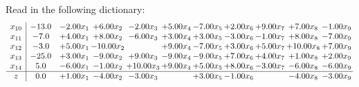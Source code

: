 \documentclass[9pt]{article}
\begin{document}
Read in the following dictionary:
\[\begin{array}{c| c c@{\hskip 2pt} c@{\hskip 2pt} c@{\hskip 2pt} c@{\hskip 2pt} c@{\hskip 2pt} c@{\hskip 2pt} c@{\hskip 2pt} c@{\hskip 2pt} c@{\hskip 2pt} }
 x_{10}   &  -13.0 & -2.00 x_{1} & +  6.00 x_{2} & -2.00 x_{3} & +  5.00 x_{4} & -7.00 x_{5} & +  2.00 x_{6} & +  9.00 x_{7} & +  7.00 x_{8} & -1.00 x_{9}\\
 x_{11}   &  -7.0 & +  4.00 x_{1} & +  8.00 x_{2} & -6.00 x_{3} & +  3.00 x_{4} & +  3.00 x_{5} & -3.00 x_{6} & -1.00 x_{7} & +  8.00 x_{8} & -7.00 x_{9}\\
 x_{12}   &  -3.0 & +  5.00 x_{1} & -10.00 x_{2} &   & +  9.00 x_{4} & -7.00 x_{5} & +  3.00 x_{6} & +  5.00 x_{7} & + 10.00 x_{8} & +  7.00 x_{9}\\
 x_{13}   &  -25.0 & +  3.00 x_{1} & -9.00 x_{2} & +  9.00 x_{3} & -9.00 x_{4} & -9.00 x_{5} & +  7.00 x_{6} & +  4.00 x_{7} & +  1.00 x_{8} & +  2.00 x_{9}\\
 x_{14}   &  5.0 & -6.00 x_{1} & -1.00 x_{2} & + 10.00 x_{3} & +  9.00 x_{4} & +  5.00 x_{5} & +  8.00 x_{6} & -3.00 x_{7} & -6.00 x_{8} & -6.00 x_{9}\\
\hline
z    &  0.0 & +  1.00 x_{1} & -4.00 x_{2} & -3.00 x_{3} &   & +  3.00 x_{5} & -1.00 x_{6} &   & -4.00 x_{8} & -3.00 x_{9}\\
\end{array}\]
\end{document}
